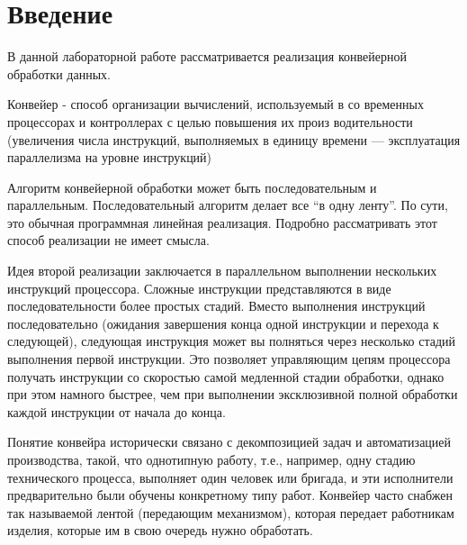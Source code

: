 \chapter*{Введение}

В данной лабораторной работе рассматривается реализация кон­вейерной обработки данных.

Конвейер\cite{pipeline} - способ организации вычислений, используемый в со­
временных процессорах и контроллерах с целью повышения их произ­
водительности (увеличения числа инструкций, выполняемых в единицу
времени — эксплуатация параллелизма на уровне инструкций)

Алгоритм конвейерной обработки может быть последовательным
и параллельным. Последовательный алгоритм делает все ``в одну лен­ту''. 
По сути, это обычная программная линейная реализация. Подробно
рассматривать этот способ реализации не имеет смысла.

Идея второй реализации заключается в параллельном выполне­нии
нескольких инструкций процессора. Сложные инструкции представ­ляются 
в виде последовательности более простых стадий. Вместо выполнения 
инструкций последовательно (ожидания завершения конца одной
инструкции и перехода к следующей), следующая инструкция может вы­
полняться через несколько стадий выполнения первой инструкции. Это
позволяет управляющим цепям процессора получать инструкции со ско­ростью 
самой медленной стадии обработки, однако при этом намного
быстрее, чем при выполнении эксклюзивной полной обработки каждой
инструкции от начала до конца.
	
Понятие конвейра исторически связано с декомпозицией задач и
автоматизацией производства, такой, что однотипную работу, т.е., напри­мер,
 одну стадию технического процесса, выполняет один человек или
бригада, и эти исполнители предварительно были обучены конкретному
типу работ. Конвейер часто снабжен так называемой лентой (передающим 
механизмом), которая передает работникам изделия, которые им в свою 
очередь нужно обработать. \cite{parallell}

